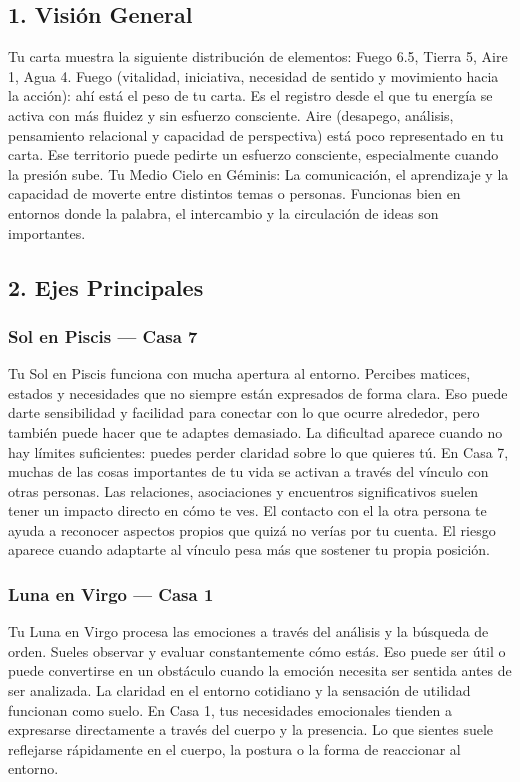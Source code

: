 \documentclass[11pt,a4paper]{article}\usepackage[utf8]{inputenc}
\begin{document}
\vspace{0.5cm}

\subsection{1. Visión General}

Tu carta muestra la siguiente distribución de elementos: Fuego 6.5, Tierra 5, Aire 1, Agua 4. Fuego (vitalidad, iniciativa, necesidad de sentido y movimiento hacia la acción): ahí está el peso de tu carta. Es el registro desde el que tu energía se activa con más fluidez y sin esfuerzo consciente. Aire (desapego, análisis, pensamiento relacional y capacidad de perspectiva) está poco representado en tu carta. Ese territorio puede pedirte un esfuerzo consciente, especialmente cuando la presión sube.  Tu Medio Cielo en Géminis: La comunicación, el aprendizaje y la capacidad de moverte entre distintos temas o personas. Funcionas bien en entornos donde la palabra, el intercambio y la circulación de ideas son importantes.

\subsection{2. Ejes Principales}

\subsubsection*{Sol en Piscis — Casa 7}
Tu Sol en Piscis funciona con mucha apertura al entorno. Percibes matices, estados y necesidades que no siempre están expresados de forma clara. Eso puede darte sensibilidad y facilidad para conectar con lo que ocurre alrededor, pero también puede hacer que te adaptes demasiado. La dificultad aparece cuando no hay límites suficientes: puedes perder claridad sobre lo que quieres tú. En Casa 7, muchas de las cosas importantes de tu vida se activan a través del vínculo con otras personas. Las relaciones, asociaciones y encuentros significativos suelen tener un impacto directo en cómo te ves. El contacto con el la otra persona te ayuda a reconocer aspectos propios que quizá no verías por tu cuenta. El riesgo aparece cuando adaptarte al vínculo pesa más que sostener tu propia posición.

\subsubsection*{Luna en Virgo — Casa 1}
Tu Luna en Virgo procesa las emociones a través del análisis y la búsqueda de orden. Sueles observar y evaluar constantemente cómo estás. Eso puede ser útil o puede convertirse en un obstáculo cuando la emoción necesita ser sentida antes de ser analizada. La claridad en el entorno cotidiano y la sensación de utilidad funcionan como suelo. En Casa 1, tus necesidades emocionales tienden a expresarse directamente a través del cuerpo y la presencia. Lo que sientes suele reflejarse rápidamente en el cuerpo, la postura o la forma de reaccionar al entorno.
\end{document}
